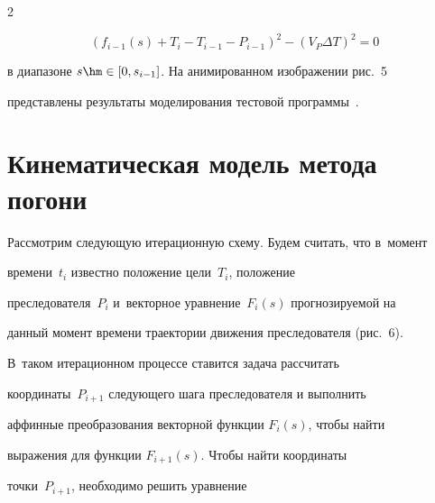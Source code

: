 \begin{multicols}{2}
{{{}}}





\vspace*{15pt}











 \noindent


 $$


  \left( f_{i-1}(s) +T_i-T_{i-1} -P_{i-1}\right)^2 -\left( V_P \Delta T\right)^2=0


  $$


в диапазоне $s\hm\in [0, s_{i-1}]$. На анимированном изоб\-ра\-же\-нии рис.~5 


представлены результаты моделирования тестовой программы~\cite{11-dub}. 





\section{Кинематическая модель метода погони}








\vspace*{-12pt}











Рассмотрим следующую итерационную схему. Будем считать, что в~момент 


времени~$t_i$ известно положение цели~$T_i$, положение 


преследователя~$P_i$ и~векторное уравнение~$F_i(s)$ прогнозируемой на 


данный момент времени траектории движения преследователя (рис.~6). 


В~таком итерационном процессе ставится задача рассчитать 


координаты~$P_{i+1}$ следующего шага преследователя и выполнить 


аффинные преобразования векторной функции $F_i(s)$, чтобы найти 


выражения для функции $F_{i+1}(s)$. Чтобы найти координаты  


точки~$P_{i+1}$, необходимо решить уравнение



\end{multicols}
